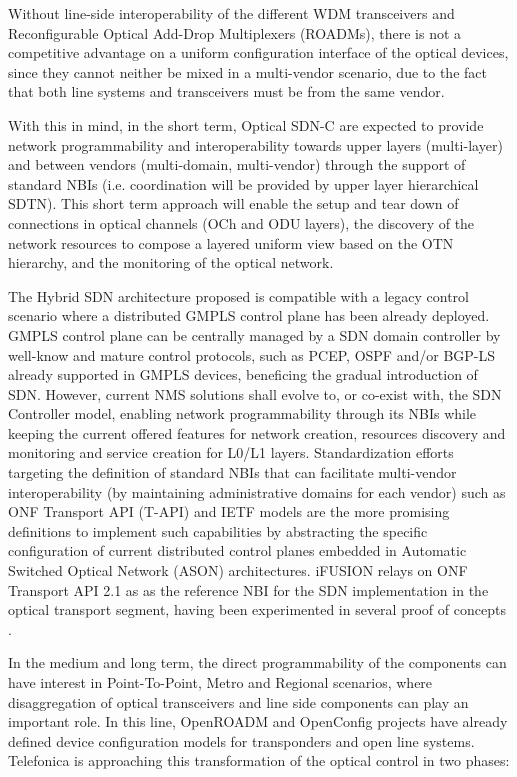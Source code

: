 \documentclass[a4paper,fleqn]{cas-dc}
\begin{document}
Without line-side interoperability of the different WDM transceivers and Reconfigurable Optical Add-Drop Multiplexers (ROADMs), there is not a competitive advantage on a uniform configuration interface of the optical devices, since they cannot neither be mixed in a multi-vendor scenario, due to the fact that both line systems and transceivers must be from the same vendor.

With this in mind, in the short term, Optical SDN-C are expected to provide network programmability and interoperability towards upper layers (multi-layer) and between vendors (multi-domain, multi-vendor) through the support of standard NBIs (i.e. coordination will be provided by upper layer hierarchical SDTN). This short term approach will enable the setup and tear down of connections in optical channels (OCh and ODU layers), the discovery of the network resources to compose a layered uniform view based on the OTN hierarchy, and the monitoring of the optical network.

The Hybrid SDN architecture proposed is compatible with a legacy control scenario where a distributed GMPLS control plane has been already deployed. GMPLS control plane can be centrally managed by a SDN domain controller by well-know and mature control protocols, such as PCEP, OSPF and/or BGP-LS already supported in GMPLS devices, beneficing the gradual introduction of SDN. However, current NMS solutions shall evolve to, or co-exist with, the SDN Controller model, enabling network programmability through its NBIs while keeping the current offered features for network creation, resources discovery and monitoring and service creation for L0/L1 layers. Standardization efforts targeting the definition of standard NBIs that can facilitate multi-vendor interoperability (by maintaining administrative domains for each vendor) such as ONF Transport API (T-API) \cite{lopez2016transport} and IETF models \cite{wu2017service} are the more promising definitions to implement such capabilities by abstracting the specific configuration of current distributed control planes embedded in Automatic Switched Optical Network (ASON) architectures. 
i\uppercase{FUSION} relays on ONF Transport API 2.1 as as the reference NBI for the SDN implementation in the optical transport segment, having been experimented in several proof of concepts \cite{mayoral2016first,mayoral2017control,bravalheri2019vnf}. 

In the medium and long term, the direct programmability of the components can have interest in Point-To-Point, Metro and Regional scenarios, where disaggregation of optical transceivers and line side components can play an important role. In this line, OpenROADM \cite{oda2016learning,kundrat2019opening} and OpenConfig \cite{shaikhopenconfig} projects have already defined device configuration models for transponders and open line systems. Telefonica is approaching this transformation of the optical control in two phases:
\end{document}
